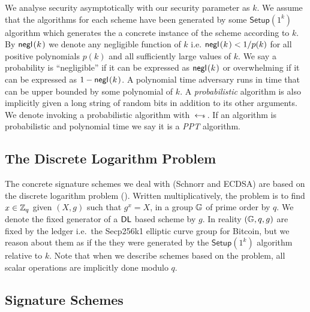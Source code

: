 We analyse security asymptotically with our security parameter as $k$.
We assume that the algorithms for each scheme have been generated by some $\textsf{Setup}(1^k)$ algorithm which generates the a concrete instance of the scheme according to $k$.
By $\negl[k]$ we denote any negligible function of $k$ i.e.  $\negl[k] < 1/p(k)$  for all positive polynomials $p(k)$ and all sufficiently large values of $k$.
We say a probability is ``negligible'' if it can be expressed as $\negl[k]$ or overwhelming if it can be expressed as $1 - \negl[k]$.
A polynomial time adversary runs in time that can be upper bounded by some polynomial of $k$. A \emph{probabilistic} algorithm is also implicitly given a long string of random bits in addition to its other arguments. We denote invoking a probabilistic algorithm with $\hskip2.3pt{\gets\!\!\mbox{\tiny${\$}$\normalsize}}\,$. If an algorithm is probabilistic and polynomial time we say it is a \emph{PPT} algorithm.

\subsection{The Discrete Logarithm Problem}

The concrete signature schemes we deal with (Schnorr and ECDSA) are based on the discrete logarithm problem (\DLOG). Written multiplicatively, the \DLOG problem is to find $x \in \mathbb{Z}_q$ given $(X,g)$ such that $g^x = X$, in a group $\mathbb{G}$ of prime order by $q$. We denote the fixed generator of a $\textsf{DL}$ based scheme by $g$. In reality $(\mathbb{G},q,g)$ are fixed by the ledger i.e.\ the Secp256k1 elliptic curve group for Bitcoin, but we reason about them as if the they were generated by the $\textsf{Setup}(1^k)$ algorithm relative to $k$. Note that when we describe schemes based on the \DLOG problem, all scalar operations are implicitly done modulo $q$.


\subsection{Signature Schemes}




